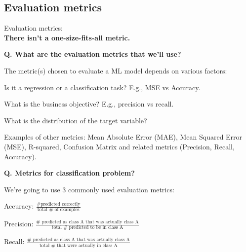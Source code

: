 \subsection{Evaluation metrics}
\begin{transitionsubframe}
  \begin{center}
    \Huge Evaluation metrics:\\\textbf{There isn't a one-size-fits-all metric.}
  \end{center}
\end{transitionsubframe}

\begin{frame}[fragile]{\textbf{Q. What are the evaluation metrics that we'll use?}}
\begin{wideitemize}
  \item The metric(s) chosen to evaluate a ML model depends on various factors:\medskip
  \begin{wideitemize}
    \item Is it a regression or a classification task? E.g., MSE vs Accuracy.
    \item What is the business objective? E.g., precision vs recall.
    \item What is the distribution of the target variable?
  \end{wideitemize}
  \item Examples of other metrics: Mean Absolute Error (MAE), Mean Squared Error
    (MSE), R-squared, Confusion Matrix and related metrics (Precision, Recall, Accuracy).
\end{wideitemize}
\end{frame}


\begin{frame}[fragile]{\textbf{Q. Metrics for classification problem?}}
\begin{wideitemize}
  \item We're going to use 3 commonly used evaluation metrics:\medskip
  \begin{wideitemize}
    \item Accuracy: $\frac{\# \text{predicted correctly}}{\text{total } \# \text{ of examples}}$
    \item Precision:
    $\frac{\# \text{ predicted as class A that was actually class A}}{\text{total } \# \text{ predicted to be in class A}}$
    \item Recall:
    $\frac{\# \text{ predicted as class A that was actually class A}}{\text{total } \# \text{ that were actually in class A}}$
  \end{wideitemize}
\end{wideitemize}
\end{frame}

